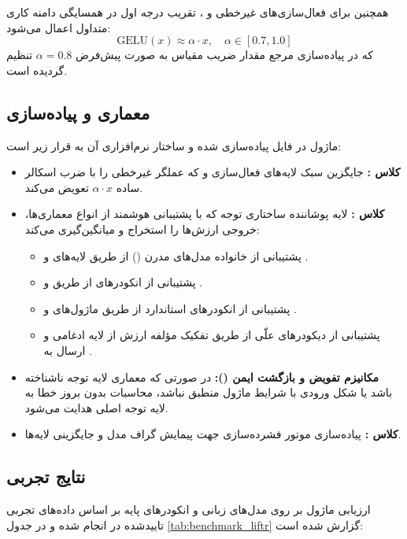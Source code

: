 همچنین برای فعال‌سازی‌های غیرخطی  و ، تقریب درجه اول در همسایگی دامنه کاری متداول اعمال می‌شود:
\begin{equation}
\text{GELU}(x) \approx \alpha \cdot x, \quad \alpha \in [0.7, 1.0]
\end{equation}
که در پیاده‌سازی مرجع مقدار ضریب مقیاس به صورت پیش‌فرض $\alpha = 0.8$ تنظیم گردیده است.

\subsection{معماری و پیاده‌سازی}
ماژول در فایل  پیاده‌سازی شده و ساختار نرم‌افزاری آن به قرار زیر است:
\begin{itemize}
    \item \textbf{کلاس :} جایگزین سبک لایه‌های فعال‌سازی  و  که عملگر غیرخطی را با ضرب اسکالر ساده $\alpha \cdot x$ تعویض می‌کند.
    \item \textbf{کلاس :} لایه پوشاننده ساختاری توجه که با پشتیبانی هوشمند از انواع معماری‌ها، خروجی ارزش‌ها را استخراج و میانگین‌گیری می‌کند:
    \begin{itemize}
        \item پشتیبانی از خانواده مدل‌های مدرن () از طریق لایه‌های  و .
        \item پشتیبانی از انکودرهای  از طریق  و .
        \item پشتیبانی از انکودرهای استاندارد  از طریق ماژول‌های  و .
        \item پشتیبانی از دیکودرهای علّی  از طریق تفکیک مؤلفه ارزش از لایه ادغامی  و ارسال به .
    \end{itemize}
    \item \textbf{مکانیزم تفویض و بازگشت ایمن ():} در صورتی که معماری لایه توجه ناشناخته باشد یا شکل ورودی با شرایط ماژول منطبق نباشد، محاسبات بدون بروز خطا به لایه توجه اصلی هدایت می‌شود.
    \item \textbf{کلاس :} پیاده‌سازی موتور فشرده‌سازی جهت پیمایش گراف مدل و جایگزینی لایه‌ها.
\end{itemize}

\subsection{نتایج تجربی}
ارزیابی ماژول  بر روی مدل‌های زبانی و انکودرهای پایه بر اساس داده‌های تجربی تاییدشده در  انجام شده و در جدول \ref{tab:benchmark_liftr} گزارش شده است:

